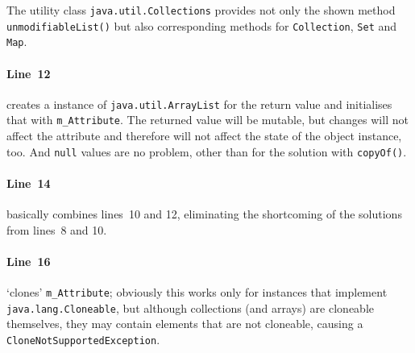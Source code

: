 \documentclass[11pt,a4paper, titlepage, parskip=half, headsepline, footsepline, cleardoublepage=current, headheight=1cm]{scrbook}
\begin{document}
The utility class \lstinline|java.util.Collections|\autocite{ORACLE_DOC_COLLECTIONS_CLASS} provides not only the shown method \lstinline|unmodifiableList()|\autocite{ORACLE_DOC_COLLECTIONS:unmodifiableList} but also corresponding methods for \lstinline|Collection|\autocite{ORACLE_DOC_COLLECTIONS:unmodifiableCollection}, \lstinline|Set|\autocite{ORACLE_DOC_COLLECTIONS:unmodifiableSet} and \lstinline|Map|\autocite{ORACLE_DOC_COLLECTIONS:unmodifiableMap}. 

\paragraph{Line~12} creates a instance of \lstinline|java.util.ArrayList|\autocite{ORACLE_DOC_ARRAYLIST_CLASS} for the return value and initialises that with \lstinline|m_Attribute|. The returned value will be mutable, but changes will not affect the attribute and therefore will not affect the state of the object instance, too. And \lstinline|null| values are no problem, other than for the solution with \lstinline|copyOf()|.

\paragraph{Line~14} basically combines lines~10 and 12, eliminating the shortcoming of the solutions from lines~8 and 10.

\paragraph{Line~16} ‘clones’ \lstinline|m_Attribute|; obviously this works only for instances that implement \lstinline|java.lang.Cloneable|\autocite{ORACLE_DOC_CLONEABLE_INTERFACE}, but although collections (and arrays) are cloneable themselves, they may contain elements that are not cloneable, causing a \lstinline|CloneNotSupportedException|\autocite{ORACLE_DOC_CLONENOTSUPPORTEDEXCEPTION_CLASS}.\\[1\baselineskip]
\end{document}
